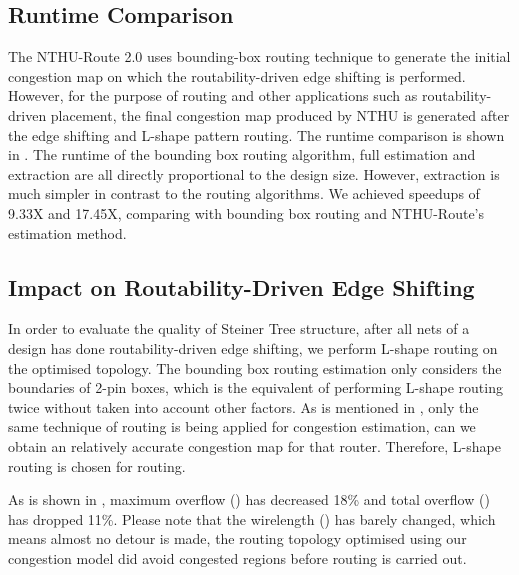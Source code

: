 \subsection{Runtime Comparison}
The NTHU-Route 2.0 uses bounding-box routing technique to generate the initial congestion map on which the routability-driven edge shifting is performed. However, for the purpose of routing and other applications such as routability-driven placement, the final congestion map produced by NTHU is generated after the edge shifting and L-shape pattern routing. The runtime comparison is shown in . The runtime of the bounding box routing algorithm, full estimation and extraction are all directly proportional to the design size. However, extraction is much simpler in contrast to the routing algorithms. We achieved speedups of 9.33X and 17.45X, comparing with bounding box routing and NTHU-Route's estimation method.

\subsection{Impact on Routability-Driven Edge Shifting}
In order to evaluate the quality of Steiner Tree structure, after all nets of a design has done routability-driven edge shifting, we perform L-shape routing on the optimised topology. The bounding box routing estimation only considers the boundaries of 2-pin boxes, which is the equivalent of performing L-shape routing twice without taken into account other factors. As is mentioned in \cite{fastroute}, only the same technique of routing is being applied for congestion estimation, can we obtain an relatively accurate congestion map for that router. Therefore, L-shape routing is chosen for routing.

As is shown in , maximum overflow () has decreased 18\% and total overflow () has dropped 11\%. Please note that the wirelength () has barely changed, which means almost no detour is made, the routing topology optimised using our congestion model did avoid congested regions before routing is carried out.


